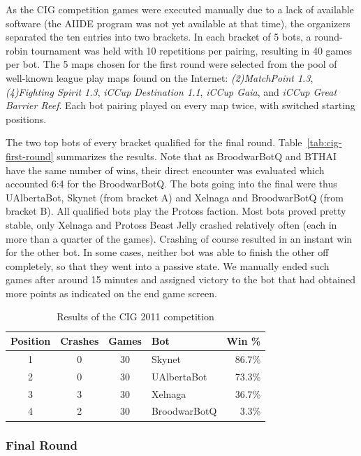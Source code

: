 \documentclass[journal]{IEEEtran}
\begin{document}
As the CIG competition games were executed manually due to
a lack of available software (the AIIDE program was not yet
available at that time), the organizers separated the ten entries into
two brackets. In each bracket of 5 bots, a round-robin
tournament was held with 10 repetitions per pairing, resulting
in 40 games per bot.
The 5 maps chosen for the first round were selected from the pool
of well-known league play maps found on the Internet:
\emph{(2)MatchPoint 1.3}, \emph{(4)Fighting Spirit 1.3}, 
\emph{iCCup Destination 1.1}, \emph{iCCup Gaia}, and 
\emph{iCCup Great Barrier Reef}. Each bot pairing played
on every map twice, with switched starting positions.


The two top bots of every bracket qualified
for the final round. Table~\ref{tab:cig-first-round} summarizes
the results.
Note that as BroodwarBotQ and BTHAI have the same number of wins,
their direct encounter was evaluated which accounted 6:4 for the BroodwarBotQ.
The bots going into the final were thus UAlbertaBot, Skynet (from bracket A)
and Xelnaga and BroodwarBotQ (from bracket B). All qualified bots play the
Protoss faction. Most bots proved pretty stable, only Xelnaga and Protoss 
Beast Jelly crashed relatively often (each in more than a quarter of the games). 
Crashing of course resulted in an instant win for the other bot.
In some cases, neither bot was able to finish the other off completely,
so that they went into a passive state. We manually ended such games after
around 15 minutes and assigned victory to the bot that had obtained more
points as indicated on the end game screen.

\begin{table}[!b]
\caption{Results of the CIG 2011 competition}
\label{tab:cig-final-round}
\centering
\begin{tabular}{|c|c|c|l|r|}
\hline
{\bfseries Position} & {\bfseries Crashes} & {\bfseries Games} & {\bfseries Bot} & {\bfseries Win \%} \\
\hline
1 & 0 &  30 &  Skynet       &  86.7\%\\
2 & 0 &  30 &  UAlbertaBot  &  73.3\%\\
3 & 3 &  30 &  Xelnaga      &  36.7\%\\
4 & 2 &  30 &  BroodwarBotQ   &  3.3\%\\
\hline
\end{tabular}
\end{table}



\subsubsection{Final Round}
\label{sec:cig-final-round}
\end{document}
